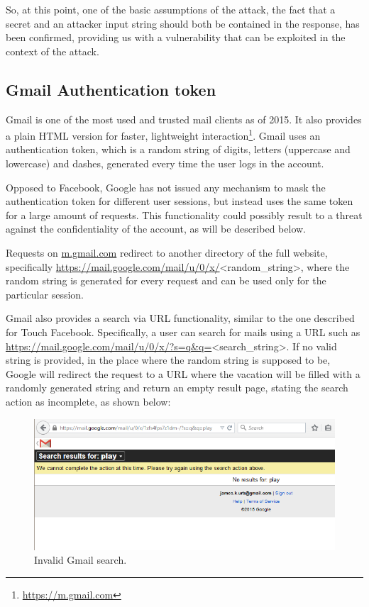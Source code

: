 So, at this point, one of the basic assumptions of the attack, the fact that a
secret and an attacker input string should both be contained in the response,
has been confirmed, providing us with a vulnerability that can be exploited in
the context of the attack.

\subsection{Gmail Authentication token}\label{subsec:gmail_token}

Gmail is one of the most used and trusted mail clients as of 2015. It also
provides a plain HTML version for faster, lightweight
interaction\footnote{\url{https://m.gmail.com}}. Gmail uses an authentication
token, which is a random string of digits, letters (uppercase and lowercase) and
dashes, generated every time the user logs in the account.

Opposed to Facebook, Google has not issued any mechanism to mask the
authentication token for different user sessions, but instead uses the same
token for a large amount of requests. This functionality could possibly result
to a threat against the confidentiality of the account, as will be described
below.

Requests on \url{m.gmail.com} redirect to another directory of the full website,
specifically \url{https://mail.google.com/mail/u/0/x/}<random\_string>, where
the random string is generated for every request and can be used only for the
particular session.

Gmail also provides a search via URL functionality, similar to the one described
for Touch Facebook. Specifically, a user can search for mails using a URL such
as \url{https://mail.google.com/mail/u/0/x/?s=q&q=}<search\_string>. If no
valid string is provided, in the place where the random string is supposed
to be, Google will redirect the request to a URL where the vacation will be
filled with a randomly generated string and return an empty result page,
stating the search action as incomplete, as shown below:

\begin{figure}[H] \caption{Invalid Gmail search.} \centering
\includegraphics[width=1\textwidth]{diagrams/gmail_search.png}\end{figure}

